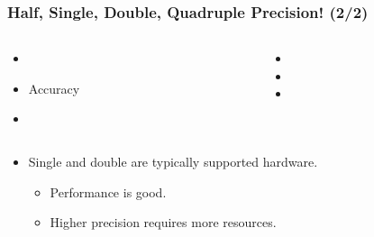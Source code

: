 \begin{frame}

\frametitle{Half, Single, Double, Quadruple Precision! (2/2)}

\begin{columns}[t]

\begin{column}{0.5\textwidth}

\begin{itemize}

\item {}

\item Accuracy

\item {}

\end{itemize}

\end{column}

\begin{column}{0.5\textwidth}

\begin{itemize}

\item {}

\item {}

\item {}

\end{itemize}

\end{column}

\end{columns}

\vspace{\fill}

\begin{itemize}

\item<2-> Single and double are typically supported hardware.

\begin{itemize}

\item Performance is good.

\item Higher precision requires more resources.


\end{itemize}
\end{itemize}
\end{frame}
